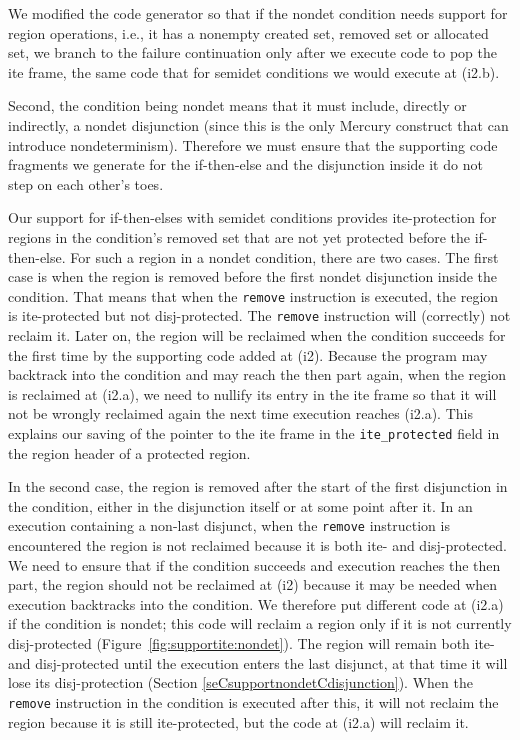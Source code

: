 \documentclass{tlp}
\newcommand{\code}[1]{{\tt#1}}
\begin{document}
We modified the code generator so that if the nondet condition
needs support for region operations,
i.e., it has a nonempty created set, removed set or allocated set,
we branch to the failure continuation
only after we execute code to pop the ite frame,
the same code that for semidet conditions we would execute at (i2.b).

Second, the condition being nondet means
that it must include, directly or indirectly, a nondet disjunction
(since this is the only Mercury construct that can introduce nondeterminism).
Therefore we must ensure that the supporting code fragments we generate
for the if-then-else and the disjunction inside it
do not step on each other's toes.

Our support for if-then-elses with semidet conditions provides ite-protection
for regions in the condition's removed set
that are not yet protected before the if-then-else.
For such a region in a nondet condition, there are two cases.
The first case is when the region is removed
before the first nondet disjunction inside the condition.
That means that when the \code{remove} instruction is executed,
the region is ite-protected but not disj-protected.
The \code{remove} instruction will (correctly) not reclaim it.
Later on, the region will be reclaimed
when the condition succeeds for the first time by
the supporting code added at (i2).
Because the program may backtrack into the condition and
may reach the then part again,
when the region is reclaimed at (i2.a),
we need to nullify its entry in the ite frame
so that it will not be wrongly reclaimed again
the next time execution reaches (i2.a).
This explains our saving of the pointer to the ite frame
in the \code{ite\_protected} field in the region header of a protected region.

In the second case, the region is removed after the start
of the first disjunction in the condition,
either in the disjunction itself or at some point after it.
In an execution containing a non-last disjunct,
when the \code{remove} instruction is encountered
the region is not reclaimed because it is both ite- and disj-protected.
We need to ensure that if the condition succeeds
and execution reaches the then part,
the region should not be reclaimed at (i2) because
it may be needed when execution backtracks into the condition.
We therefore put different code at (i2.a) if the condition is nondet;
this code will reclaim a region only if it is not currently disj-protected
(Figure~\ref{fig:supportite:nondet}).
The region will remain both ite- and disj-protected until
the execution enters the last disjunct,
at that time it will lose its disj-protection
(Section \ref{seCsupportnondetCdisjunction}).
When the \code{remove} instruction in the condition is executed after this,
it will not reclaim the region because it is still ite-protected,
but the code at (i2.a) will reclaim it.
\end{document}
